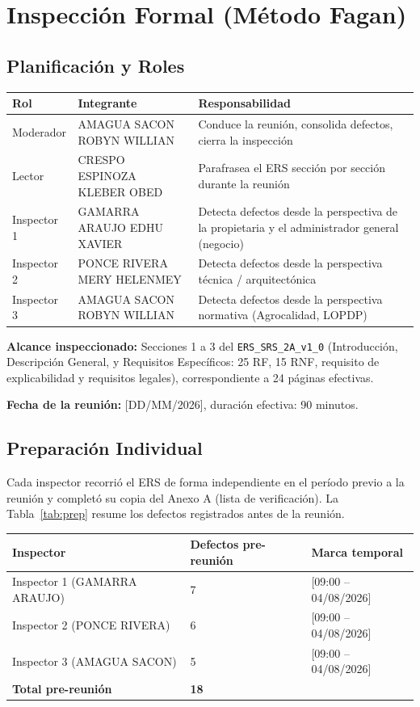 \documentclass[11pt,a4paper]{article}
\begin{document}
\section{Inspección Formal (Método Fagan)}
\subsection{Planificación y Roles}
\begin{longtable}{|p{2.8cm}|p{4.5cm}|p{7cm}|}
\hline
\textbf{Rol} & \textbf{Integrante} & \textbf{Responsabilidad} \\
\hline
Moderador & AMAGUA SACON ROBYN WILLIAN & Conduce la reunión, consolida defectos, cierra la inspección \\
\hline
Lector & CRESPO ESPINOZA KLEBER OBED & Parafrasea el ERS sección por sección durante la reunión \\
\hline
Inspector 1 & GAMARRA ARAUJO EDHU XAVIER & Detecta defectos desde la perspectiva de la propietaria y el administrador general (negocio) \\
\hline
Inspector 2 & PONCE RIVERA MERY HELENMEY & Detecta defectos desde la perspectiva técnica / arquitectónica \\
\hline
Inspector 3 & AMAGUA SACON ROBYN WILLIAN & Detecta defectos desde la perspectiva normativa (Agrocalidad, LOPDP) \\
\hline
\end{longtable}

\textbf{Alcance inspeccionado:} Secciones 1 a 3 del \texttt{ERS\_SRS\_2A\_v1\_0} (Introducción, Descripción General, y Requisitos Específicos: 25 RF, 15 RNF, requisito de explicabilidad y requisitos legales), correspondiente a 24 páginas efectivas.

\textbf{Fecha de la reunión:} [DD/MM/2026], duración efectiva: 90 minutos.

\subsection{Preparación Individual}
Cada inspector recorrió el ERS de forma independiente en el período previo a la
reunión y completó su copia del Anexo A (lista de verificación). La Tabla~\ref{tab:prep} resume los
defectos registrados antes de la reunión.

\begin{longtable}{|p{6cm}|p{4cm}|p{4cm}|}
\hline
\textbf{Inspector} & \textbf{Defectos pre-reunión} & \textbf{Marca temporal} \\
\hline
Inspector 1 (GAMARRA ARAUJO) & 7 & [09:00 -- 04/08/2026] \\
\hline
Inspector 2 (PONCE RIVERA) & 6 & [09:00 -- 04/08/2026] \\
\hline
Inspector 3 (AMAGUA SACON) & 5 & [09:00 -- 04/08/2026] \\
\hline
\textbf{Total pre-reunión} & \textbf{18} & \\
\hline
\end{longtable}
\label{tab:prep}
\end{document}
